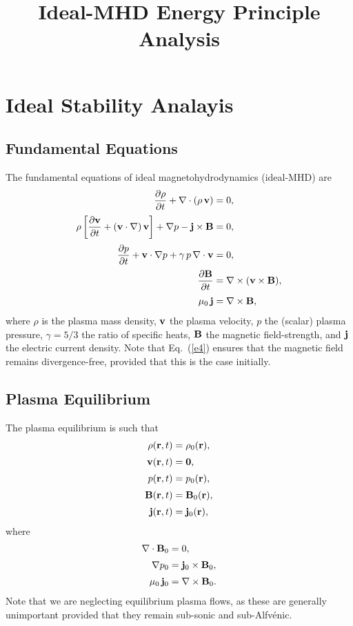 \documentclass[12pt,prb,aps,notitlepage]{revtex4-1}
\begin{document}
\title{Ideal-MHD Energy Principle Analysis}
\maketitle

\section{Ideal Stability Analayis}
\subsection{Fundamental Equations}
The fundamental  equations of ideal magnetohydrodynamics (ideal-MHD) are
\begin{align}
\frac{\partial\rho}{\partial t} + \nabla\cdot(\rho\,{\bf v}) & =0,\label{e1}\\[0.5ex]
\rho\left[\frac{\partial{\bf v}}{\partial t} + ({\bf v}\cdot\nabla)\,{\bf v}\right]+\nabla p - {\bf j}\times {\bf B}&=0,\label{e2}\\[0.5ex]
\frac{\partial p}{\partial t}+{\bf v}\cdot\nabla p + \gamma\,p\,\nabla\cdot{\bf v} &=0,\label{e3}\\[0.5ex]
\frac{\partial {\bf B}}{\partial t} &= \nabla\times({\bf v}\times {\bf B}),\label{e4}\\[0.5ex]
\mu_0\,{\bf j} &= \nabla\times {\bf B},\label{e5}
\end{align}
where $\rho$ is the plasma mass density, ${\bf v}$ the plasma velocity, $p$ the (scalar) plasma pressure, $\gamma=5/3$ the ratio of specific heats,
${\bf B}$ the magnetic field-strength, and ${\bf j}$ the electric current density. 
Note that Eq.~(\ref{e4}) ensures that the magnetic field remains divergence-free, provided that 
this is the case initially. 

\subsection{Plasma Equilibrium}
The plasma equilibrium is such that
\begin{align}
\rho({\bf r},t) &= \rho_0({\bf r}),\\[0.5ex]
{\bf v}({\bf r},t) &= {\bf 0},\label{e7}\\[0.5ex]
p({\bf r},t) &= p_0({\bf r}),\\[0.5ex]
{\bf B}({\bf r},t) &= {\bf B}_0({\bf r}),\\[0.5ex]
{\bf j}({\bf r},t) &= {\bf j}_0({\bf r}),
\end{align}
where
\begin{align}
\nabla\cdot{\bf B}_0&= 0,\label{e6}\\[0.5ex]
\nabla p_0 &= {\bf j}_0\times {\bf B}_0,\label{e11}\\[0.5ex]
\mu_0\,{\bf j}_0 &= \nabla\times {\bf B}_0.\label{e12}
\end{align}
Note that we are neglecting equilibrium plasma flows, as these are generally unimportant provided that they remain sub-sonic and sub-Alfv\'{e}nic. 
\end{document}
